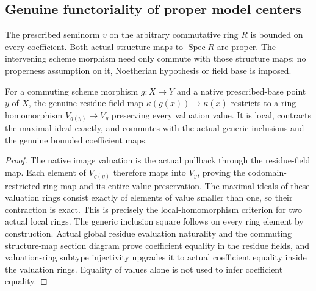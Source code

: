 \subsection{Genuine functoriality of proper model centers}
\label{subsec:proper-center-functoriality}

The prescribed seminorm $v$ on the arbitrary commutative ring $R$ is
bounded on every coefficient. Both actual structure maps to
$\operatorname{Spec}R$ are proper. The intervening scheme morphism need
only commute with those structure maps; no properness assumption on it,
Noetherian hypothesis or field base is imposed.

\begin{lemma}
\label{scheme:proper-center-valuation-ring-map}
\leanok
{}
For a commuting scheme morphism $g:X\to Y$ and a native prescribed-base
point $y$ of $X$, the genuine residue-field map
$\kappa(g(x))\to\kappa(x)$ restricts to a ring homomorphism
$V_{g(y)}\to V_y$ preserving every valuation value. It is local, contracts
the maximal ideal exactly, and commutes with the actual generic inclusions
and the genuine bounded coefficient maps.
\end{lemma}
\begin{proof}
The native image valuation is the actual pullback through the residue-field
map. Each element of $V_{g(y)}$ therefore maps into $V_y$, proving the
codomain-restricted ring map and its entire value preservation. The maximal
ideals of these valuation rings consist exactly of elements of value
smaller than one, so their contraction is exact. This is precisely the
local-homomorphism criterion for two actual local rings. The generic
inclusion square follows on every ring element by construction. Actual
global residue evaluation naturality and the commuting structure-map
section diagram prove coefficient equality in the residue fields, and
valuation-ring subtype injectivity upgrades it to actual coefficient equality
inside the valuation rings. Equality of values alone is not used to infer
coefficient equality.
\end{proof}

